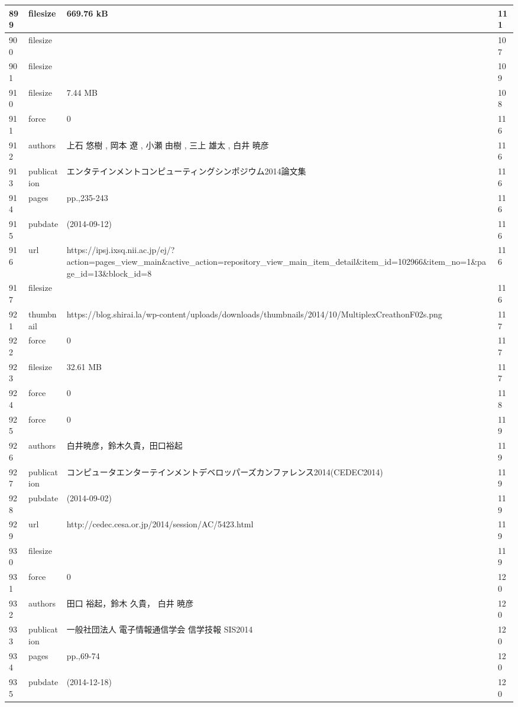 \begin{longtable}{|l|l|l|l|}
899 & filesize & 669.76 kB & 111 \\ \hline 
900 & filesize &  & 107 \\ \hline 
901 & filesize &  & 109 \\ \hline 
910 & filesize & 7.44 MB & 108 \\ \hline 
911 & force & 0 & 116 \\ \hline 
912 & authors & 上石 悠樹 , 岡本 遼 , 小瀬 由樹 , 三上 雄太 , 白井 暁彦  & 116 \\ \hline 
913 & publication & エンタテインメントコンピューティングシンポジウム2014論文集 & 116 \\ \hline 
914 & pages & pp.,235-243 & 116 \\ \hline 
915 & pubdate &  (2014-09-12)  & 116 \\ \hline 
916 & url & https://ipsj.ixsq.nii.ac.jp/ej/?action=pages\_view\_main\&active\_action=repository\_view\_main\_item\_detail\&item\_id=102966\&item\_no=1\&page\_id=13\&block\_id=8 & 116 \\ \hline 
917 & filesize &  & 116 \\ \hline 
921 & thumbnail & https://blog.shirai.la/wp-content/uploads/downloads/thumbnails/2014/10/MultiplexCreathonF02s.png & 117 \\ \hline 
922 & force & 0 & 117 \\ \hline 
923 & filesize & 32.61 MB & 117 \\ \hline 
924 & force & 0 & 118 \\ \hline 
925 & force & 0 & 119 \\ \hline 
926 & authors & 白井暁彦，鈴木久貴，田口裕起 & 119 \\ \hline 
927 & publication & コンピュータエンターテインメントデベロッパーズカンファレンス2014(CEDEC2014) & 119 \\ \hline 
928 & pubdate &  (2014-09-02)  & 119 \\ \hline 
929 & url & http://cedec.cesa.or.jp/2014/session/AC/5423.html & 119 \\ \hline 
930 & filesize &  & 119 \\ \hline 
931 & force & 0 & 120 \\ \hline 
932 & authors & 田口 裕起，鈴木 久貴， 白井 暁彦 & 120 \\ \hline 
933 & publication & 一般社団法人 電子情報通信学会 信学技報 SIS2014 & 120 \\ \hline 
934 & pages & pp.,69-74 & 120 \\ \hline 
935 & pubdate & (2014-12-18) & 120 \\ \hline 

\end{longtable}
